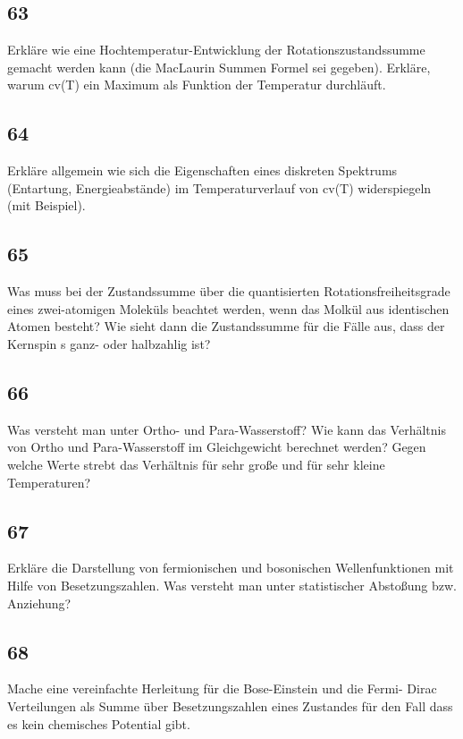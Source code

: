 \documentclass[12pt,a4paper]{report}
\newenvironment{myfrag}{\begin{it}}{\end{it}\vspace{3mm}\par}
\numberwithin{equation}{section}
\begin{document}
\subsection{63}
\begin{myfrag}
Erkläre wie eine Hochtemperatur-Entwicklung der Rotationszustandssumme
gemacht werden kann (die MacLaurin Summen Formel sei gegeben). Erkläre,
warum cv(T) ein Maximum als Funktion der Temperatur durchläuft.
\end{myfrag}
\subsection{64}
\begin{myfrag}
Erkläre allgemein wie sich die Eigenschaften eines diskreten Spektrums
(Entartung, Energieabstände) im Temperaturverlauf von cv(T) widerspiegeln
(mit Beispiel).
\end{myfrag}
\subsection{65}
\begin{myfrag}
Was muss bei der Zustandssumme über die quantisierten
Rotationsfreiheitsgrade eines zwei-atomigen Moleküls beachtet werden, wenn
das Molkül aus identischen Atomen besteht? Wie sieht dann die
Zustandssumme für die Fälle aus, dass der Kernspin s ganz- oder halbzahlig
ist?
\end{myfrag}
\subsection{66}
\begin{myfrag}
Was versteht man unter Ortho- und Para-Wasserstoff? Wie kann das
Verhältnis von Ortho und Para-Wasserstoff im Gleichgewicht berechnet
werden? Gegen welche Werte strebt das Verhältnis für sehr große und für
sehr kleine Temperaturen?
\end{myfrag}
\subsection{67}
\begin{myfrag}
Erkläre die Darstellung von fermionischen und bosonischen Wellenfunktionen
mit Hilfe von Besetzungszahlen. Was versteht man unter
statistischer Abstoßung bzw. Anziehung?
\end{myfrag}
\subsection{68}
\begin{myfrag}
Mache eine vereinfachte Herleitung für die Bose-Einstein und die Fermi-
Dirac Verteilungen als Summe über Besetzungszahlen eines Zustandes für
den Fall dass es kein chemisches Potential gibt.
\end{myfrag}
\end{document}
